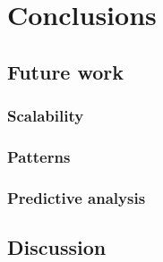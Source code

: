 \chapter{Conclusions} \label{ch:conclusions}

\section {Future work}
\subsection{Scalability}
\subsection{Patterns}
\subsection{Predictive analysis}
\section{Discussion}



